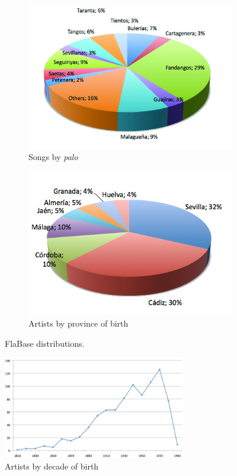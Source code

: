 \begin{figure}[ht!]
    \centering
    \begin{subfigure}{.45\textwidth}
        \centering
        \includegraphics[width=.9\linewidth]{ch05_musicology_pics/Songs-by-palo2.jpg}
    	\caption{Songs by \textit{palo}}
        \label{fig:musicology:graph-palo}
    \end{subfigure}
    \begin{subfigure}{.45\textwidth}
        \centering
        \includegraphics[width=.9\linewidth]{ch05_musicology_pics/Artists-by-province2.jpg}
		\caption{Artists by province of birth}
		\label{fig:musicology:graph-province}
    \end{subfigure}
    \caption{FlaBase distributions.}
\end{figure}


\begin{figure}[!ht]
	\centering
	\includegraphics[width=8cm]{ch05_musicology_pics/Artists-by-decade-of-birth.jpg}
	\caption{Artists by decade of birth 
	\label{fig:musicology:graph-decade}}
\end{figure}


